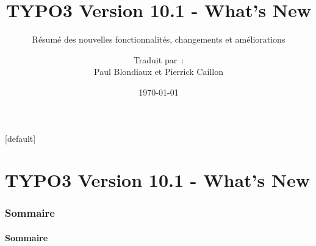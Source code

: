 \documentclass[t]{beamer}
\title{TYPO3 Version 10.1 - What's New}
\subtitle{Résumé des nouvelles fonctionnalités, changements et améliorations}
\author{
	\centerline{Traduit par~:}
	\centerline{Paul Blondiaux et Pierrick Caillon}
}
\date{\today}
\begin{document}
\sharefont


\begingroup
	[default]
	\begin{frame}
		\titlepage
	\end{frame}
\endgroup


\section*{TYPO3 Version 10.1 - What's New}
\begin{frame}[fragile]
	\frametitle{Sommaire}
	\framesubtitle{Sommaire}

	\tableofcontents

\end{frame}











%

\end{document}
